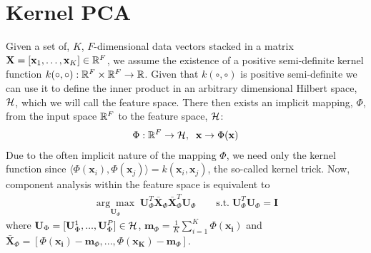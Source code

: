 \section{Kernel PCA}\label{sec:kpca}
Given a set of, $K$, $F$-dimensional data vectors stacked in a
matrix $\mathbf{X} = [\mathbf{x}_1, \ldots, \mathbf{x}_K] \in \mathbb{R}^F$, 
we assume the existence of a positive semi-definite kernel function 
$k(\circ, \circ) : \mathbb{R}^F \times \mathbb{R}^F \rightarrow \mathbb{R}$. Given that $k(\circ, \circ)$ 
is positive semi-definite we can use it to define the inner product in an 
arbitrary dimensional Hilbert space, $\mathcal{H}$, which we will call the feature 
space. There then exists an implicit mapping, $\Phi$, from the input 
space $\mathbb{R}^F$ to the feature space, $\mathcal{H}$:
\begin{equation}
    \begin{aligned}\label{eq:implicit-map}
        \Phi : \mathbb{R}^F \rightarrow \mathcal{H}, \; \; \mathbf{x} \rightarrow \Phi(\mathbf{x})
    \end{aligned}
\end{equation}
Due to the often implicit nature of the mapping $\Phi$, we need only the kernel 
function since 
$\langle \Phi(\mathbf{x}_i), \Phi(\mathbf{x}_j) \rangle  = k (\mathbf{x}_i, \mathbf{x}_j)$, 
the so-called kernel trick. Now, component analysis within the feature space 
is equivalent to
\begin{equation}
    \begin{aligned}\label{eq:feature-space-pca}
        \underset{\mathbf{U}_\Phi}{\arg\max} \; \mathbf{U}_\Phi^T \bar{\mathbf{X}}_\Phi \bar{\mathbf{X}}_\Phi^T \mathbf{U}_\Phi \qquad \text{s.t.} \; \mathbf{U}_\Phi^T \mathbf{U}_\Phi = \mathbf{I}
    \end{aligned}
\end{equation}
where $\mathbf{U}_\Phi = [\mathbf{U}_\Phi^1, ..., \mathbf{U}_\Phi^P] \in \mathcal{H}$,
$\mathbf{m}_\Phi = \frac{1}{K} \sum \limits_{i=1}^K \Phi(\mathbf{x_i})$ and
$\bar{\mathbf{X}}_\Phi = [\Phi(\mathbf{x_i}) - \mathbf{m}_\Phi, ..., \Phi(\mathbf{x_K}) - \mathbf{m}_\Phi]$.

